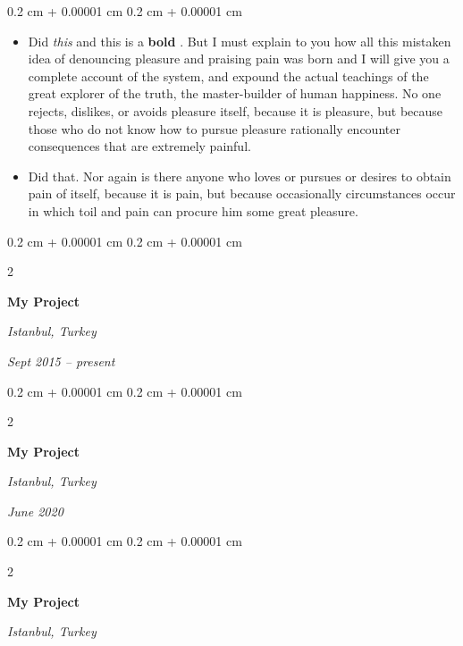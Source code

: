 \documentclass[10pt, letterpaper]{article}
\newenvironment{highlights}{
    \begin{itemize}[
        topsep=0.10 cm,
        parsep=0.10 cm,
        partopsep=0pt,
        itemsep=0pt,
        leftmargin=0.4 cm + 10pt
    ]
}{
    \end{itemize}
} %
\newenvironment{onecolentry}{
    \begin{adjustwidth}{
        0.2 cm + 0.00001 cm
    }{
        0.2 cm + 0.00001 cm
    }
}{
    \end{adjustwidth}
} %
\newenvironment{twocolentry}[2][]{
    \onecolentry
    \def\secondColumn{#2}
    \setcolumnwidth{\fill, 4.5 cm}
    \begin{paracol}{2}
}{
    \switchcolumn \raggedleft \secondColumn
    \end{paracol}
    \endonecolentry
} %
\let\hrefWithoutArrow\href
\renewcommand{\href}[2]{\hrefWithoutArrow{#1}{\ifthenelse{\equal{#2}{}}{ }{#2 }\raisebox{.15ex}{\footnotesize \faExternalLink*}}}
\begin{document}
        \vspace{0.10 cm}
        \begin{onecolentry}
            \begin{highlights}
                \item Did \textit{this} and this is a \textbf{bold} \href{https://example.com}{link}. But I must explain to you how all this mistaken idea of denouncing pleasure and praising pain was born and I will give you a complete account of the system, and expound the actual teachings of the great explorer of the truth, the master-builder of human happiness. No one rejects, dislikes, or avoids pleasure itself, because it is pleasure, but because those who do not know how to pursue pleasure rationally encounter consequences that are extremely painful.
                \item Did that. Nor again is there anyone who loves or pursues or desires to obtain pain of itself, because it is pain, but because occasionally circumstances occur in which toil and pain can procure him some great pleasure.
            \end{highlights}
        \end{onecolentry}


        \vspace{0.2 cm}

        \begin{twocolentry}{
        \textit{Istanbul, Turkey}    
            
        \textit{Sept 2015 – present}}
            \textbf{My Project}
        \end{twocolentry}



        \vspace{0.2 cm}

        \begin{twocolentry}{
        \textit{Istanbul, Turkey}    
            
        \textit{June 2020}}
            \textbf{My Project}
        \end{twocolentry}



        \vspace{0.2 cm}

        \begin{twocolentry}{
        \textit{Istanbul, Turkey}    
            
        }
            \textbf{My Project}
        \end{twocolentry}
\end{document}
